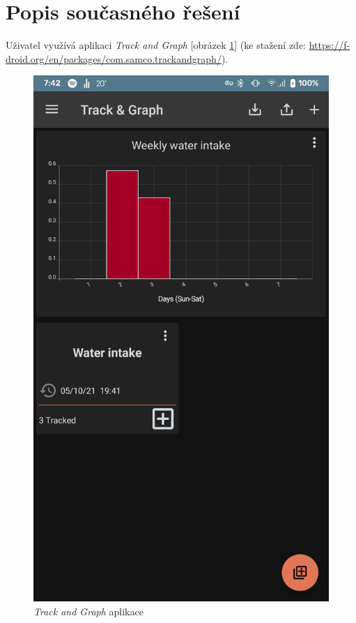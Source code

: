 \documentclass[12pt, titlepage]{article}
\begin{document}
\section{Popis současného řešení}
Uživatel využívá aplikaci \emph{Track and Graph} [obrázek \ref{fig:track-app}] (ke stažení zde: \url{https://f-droid.org/en/packages/com.samco.trackandgraph/}).
\begin{figure}[h]
	\centering
    	\includegraphics[scale=0.15]{trackgraph-pic}
    \caption{\emph{Track and Graph} aplikace}
    \label{fig:track-app}
\end{figure}
\end{document}
